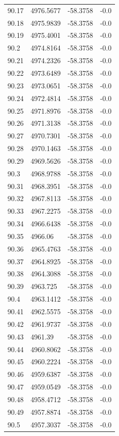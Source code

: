 \begin{table}[H]
\begin{tabular}{llll}
90.17 & 4976.5677 & -58.3758 & -0.0 \\
90.18 & 4975.9839 & -58.3758 & -0.0 \\
90.19 & 4975.4001 & -58.3758 & -0.0 \\
90.2 & 4974.8164 & -58.3758 & -0.0 \\
90.21 & 4974.2326 & -58.3758 & -0.0 \\
90.22 & 4973.6489 & -58.3758 & -0.0 \\
90.23 & 4973.0651 & -58.3758 & -0.0 \\
90.24 & 4972.4814 & -58.3758 & -0.0 \\
90.25 & 4971.8976 & -58.3758 & -0.0 \\
90.26 & 4971.3138 & -58.3758 & -0.0 \\
90.27 & 4970.7301 & -58.3758 & -0.0 \\
90.28 & 4970.1463 & -58.3758 & -0.0 \\
90.29 & 4969.5626 & -58.3758 & -0.0 \\
90.3 & 4968.9788 & -58.3758 & -0.0 \\
90.31 & 4968.3951 & -58.3758 & -0.0 \\
90.32 & 4967.8113 & -58.3758 & -0.0 \\
90.33 & 4967.2275 & -58.3758 & -0.0 \\
90.34 & 4966.6438 & -58.3758 & -0.0 \\
90.35 & 4966.06 & -58.3758 & -0.0 \\
90.36 & 4965.4763 & -58.3758 & -0.0 \\
90.37 & 4964.8925 & -58.3758 & -0.0 \\
90.38 & 4964.3088 & -58.3758 & -0.0 \\
90.39 & 4963.725 & -58.3758 & -0.0 \\
90.4 & 4963.1412 & -58.3758 & -0.0 \\
90.41 & 4962.5575 & -58.3758 & -0.0 \\
90.42 & 4961.9737 & -58.3758 & -0.0 \\
90.43 & 4961.39 & -58.3758 & -0.0 \\
90.44 & 4960.8062 & -58.3758 & -0.0 \\
90.45 & 4960.2224 & -58.3758 & -0.0 \\
90.46 & 4959.6387 & -58.3758 & -0.0 \\
90.47 & 4959.0549 & -58.3758 & -0.0 \\
90.48 & 4958.4712 & -58.3758 & -0.0 \\
90.49 & 4957.8874 & -58.3758 & -0.0 \\
90.5 & 4957.3037 & -58.3758 & -0.0 \\

\end{tabular}
\end{table}
